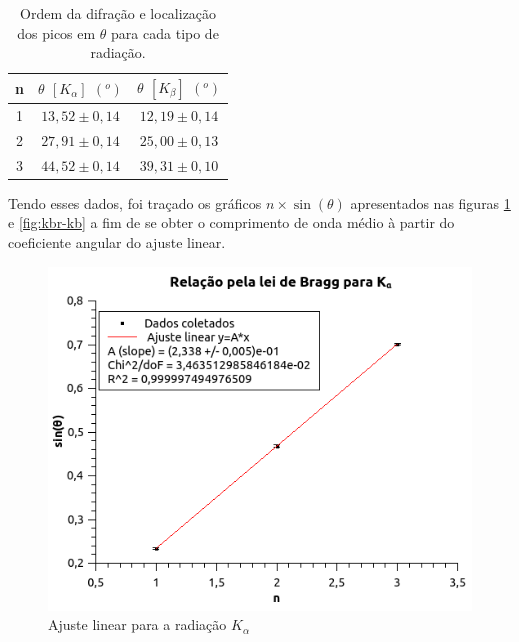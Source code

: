 \documentclass[article,12pt,openright,oneside,a4paper,brazil]{abntex2}
\begin{document}
\begin{table}[H]
    \centering
    \caption{Ordem da difração e localização dos picos em $\theta$ para cada tipo de radiação.}
    \begin{tabular}{|c|c|c|}
        \hline
         n & $\theta$ $[K_\alpha]$ $(^o)$ & $\theta$ $[K_\beta]$ $(^o)$ \\ \hline
         1 & $13,52\pm0,14$ & $12,19\pm0,14$ \\ \hline
         2 & $27,91\pm0,14$ & $25,00\pm0,13$ \\ \hline
         3 & $44,52\pm0,14$ & $39,31\pm0,10$ \\ \hline
    \end{tabular}
    \label{tab:kbr}
\end{table}

Tendo esses dados, foi traçado os gráficos $n \times \sin(\theta)$ apresentados nas figuras \ref{fig:kbr-ka} e \ref{fig:kbr-kb} a fim de se obter o comprimento de onda médio à partir do coeficiente angular do ajuste linear.

\begin{figure}[H]
    \centering
    \includegraphics[scale=0.8]{Figuras/Ka.png}
    \caption{Ajuste linear para a radiação $K_\alpha$}
    \label{fig:kbr-ka}
\end{figure}
\end{document}
